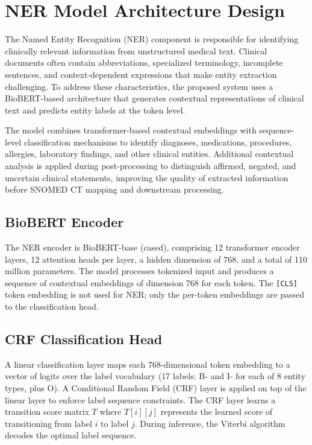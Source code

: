 \section{NER Model Architecture Design}
The Named Entity Recognition (NER) component is responsible for identifying clinically relevant information from unstructured medical text. Clinical documents often contain abbreviations, specialized terminology, incomplete sentences, and context-dependent expressions that make entity extraction challenging. To address these characteristics, the proposed system uses a BioBERT-based architecture that generates contextual representations of clinical text and predicts entity labels at the token level.

The model combines transformer-based contextual embeddings with sequence-level classification mechanisms to identify diagnoses, medications, procedures, allergies, laboratory findings, and other clinical entities. Additional contextual analysis is applied during post-processing to distinguish affirmed, negated, and uncertain clinical statements, improving the quality of extracted information before SNOMED CT mapping and downstream processing.

\subsection{BioBERT Encoder}
The NER encoder is BioBERT-base (cased), comprising 12 transformer encoder layers, 12 attention heads per layer, a hidden dimension of 768, and a total of 110 million parameters. The model processes tokenized input and produces a sequence of contextual embeddings of dimension 768 for each token. The \texttt{[CLS]} token embedding is not used for NER; only the per-token embeddings are passed to the classification head.

\subsection{CRF Classification Head}
A linear classification layer maps each 768-dimensional token embedding to a vector of logits over the label vocabulary (17 labels: B- and I- for each of 8 entity types, plus O). A Conditional Random Field (CRF) layer is applied on top of the linear layer to enforce label sequence constraints. The CRF layer learns a transition score matrix $T$ where $T[i][j]$ represents the learned score of transitioning from label $i$ to label $j$. During inference, the Viterbi algorithm decodes the optimal label sequence.

